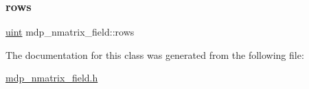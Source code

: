 \mbox{\label{classmdp__nmatrix__field_a6166f4d394efa361e3fa9552506c7c36}} 
\subsubsection{\texorpdfstring{rows}{rows}}
{\footnotesize\ttfamily \hyperlink{mdp__global__vars_8h_a91ad9478d81a7aaf2593e8d9c3d06a14}{uint} mdp\+\_\+nmatrix\+\_\+field\+::rows}



The documentation for this class was generated from the following file\+:\begin{DoxyCompactItemize}
\item 
\hyperlink{mdp__nmatrix__field_8h}{mdp\+\_\+nmatrix\+\_\+field.\+h}\end{DoxyCompactItemize}
